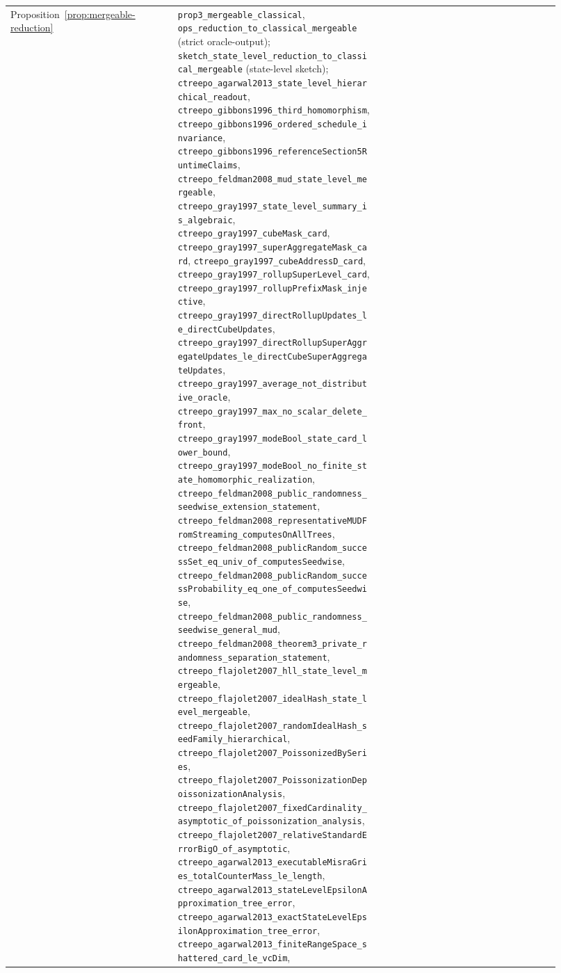 {\begin{longtable}{p{0.28\linewidth}p{0.34\linewidth}p{0.30\linewidth}}
Proposition~\ref{prop:mergeable-reduction} &
\texttt{prop3\_mergeable\_classical}, \texttt{ops\_reduction\_to\_classical\_mergeable} (strict oracle-output);
\texttt{sketch\_state\_level\_reduction\_to\_classical\_mergeable} (state-level sketch);
\texttt{ctreepo\_agarwal2013\_state\_level\_hierarchical\_readout},
\texttt{ctreepo\_gibbons1996\_third\_homomorphism},
\texttt{ctreepo\_gibbons1996\_ordered\_schedule\_invariance},
\nolinkurl{ctreepo_gibbons1996_referenceSection5RuntimeClaims},
\texttt{ctreepo\_feldman2008\_mud\_state\_level\_mergeable},
\texttt{ctreepo\_gray1997\_state\_level\_summary\_is\_algebraic},
\texttt{ctreepo\_gray1997\_cubeMask\_card},
\texttt{ctreepo\_gray1997\_superAggregateMask\_card},
\texttt{ctreepo\_gray1997\_cubeAddressD\_card},
\texttt{ctreepo\_gray1997\_rollupSuperLevel\_card},
\texttt{ctreepo\_gray1997\_rollupPrefixMask\_injective},
\nolinkurl{ctreepo_gray1997_directRollupUpdates_le_directCubeUpdates},
\nolinkurl{ctreepo_gray1997_directRollupSuperAggregateUpdates_le_directCubeSuperAggregateUpdates},
\texttt{ctreepo\_gray1997\_average\_not\_distributive\_oracle},
\texttt{ctreepo\_gray1997\_max\_no\_scalar\_delete\_front},
\nolinkurl{ctreepo_gray1997_modeBool_state_card_lower_bound},
\nolinkurl{ctreepo_gray1997_modeBool_no_finite_state_homomorphic_realization},
\texttt{ctreepo\_feldman2008\_public\_randomness\_seedwise\_extension\_statement},
\nolinkurl{ctreepo_feldman2008_representativeMUDFromStreaming_computesOnAllTrees},
\nolinkurl{ctreepo_feldman2008_publicRandom_successSet_eq_univ_of_computesSeedwise},
\nolinkurl{ctreepo_feldman2008_publicRandom_successProbability_eq_one_of_computesSeedwise},
\nolinkurl{ctreepo_feldman2008_public_randomness_seedwise_general_mud},
\texttt{ctreepo\_feldman2008\_theorem3\_private\_randomness\_separation\_statement},
\texttt{ctreepo\_flajolet2007\_hll\_state\_level\_mergeable},
\texttt{ctreepo\_flajolet2007\_idealHash\_state\_level\_mergeable},
\nolinkurl{ctreepo_flajolet2007_randomIdealHash_seedFamily_hierarchical},
\nolinkurl{ctreepo_flajolet2007_PoissonizedBySeries},
\nolinkurl{ctreepo_flajolet2007_PoissonizationDepoissonizationAnalysis},
\nolinkurl{ctreepo_flajolet2007_fixedCardinality_asymptotic_of_poissonization_analysis},
\texttt{ctreepo\_flajolet2007\_relativeStandardErrorBigO\_of\_asymptotic},
\nolinkurl{ctreepo_agarwal2013_executableMisraGries_totalCounterMass_le_length},
\nolinkurl{ctreepo_agarwal2013_stateLevelEpsilonApproximation_tree_error},
\nolinkurl{ctreepo_agarwal2013_exactStateLevelEpsilonApproximation_tree_error},
\nolinkurl{ctreepo_agarwal2013_finiteRangeSpace_shattered_card_le_vcDim},

\end{longtable}}
